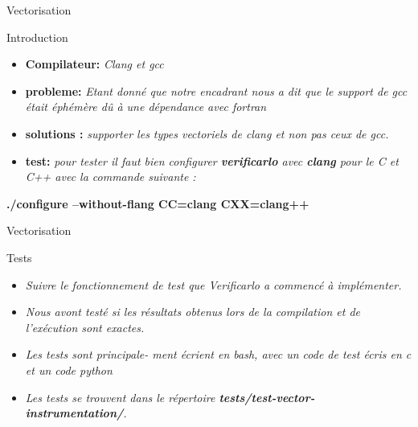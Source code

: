 \documentclass{beamer}
\begin{document}
\begin{frame}{Vectorisation}
\begin{block}{Introduction }
    \begin{itemize}
        \item \textbf{Compilateur:} \textit{ Clang et gcc} 
        \item \textbf{probleme:} \textit{ Etant donné que notre encadrant nous a dit que le support de
gcc était éphémère dû à une dépendance avec fortran}
         \item \textbf{solutions : } \textit{supporter les types vectoriels de clang et non pas ceux de gcc. }
         \item \textbf{test: } \textit{ pour tester il faut bien configurer \textbf{verificarlo} avec \textbf {clang} pour le C et C++ avec la commande suivante : }
         \end{itemize}
         \begin{center}
        \textbf{\color{blue} ./configure --without-flang CC=clang CXX=clang++ }      
          \end{center}
  \end{block}
\end{frame}

\begin{frame}{Vectorisation}
\begin{block}{Tests}
    \begin{itemize}
        \item\textit{ Suivre le fonctionnement de test que
Verificarlo a commencé à implémenter. } 
         \item\textit{Nous avont testé si les résultats obtenus lors de la compilation et de l’exécution sont exactes.} 
        
         \item \textit{Les tests sont principale-
ment écrient en bash, avec un code de test écris en c et un code python}  
         \item \textit{Les tests se trouvent dans
le répertoire \textbf{ tests/test-vector-instrumentation/}.} 
         \end{itemize}  
\end{block}
\end{frame}
\end{document}
